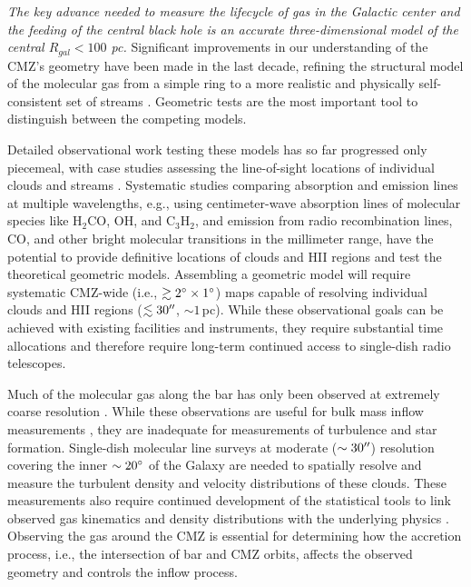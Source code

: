 \documentclass[modern]{aastex62}
\begin{document}
\textit{The key advance needed to measure the lifecycle of gas in the Galactic
center and the feeding of the central black hole is an accurate
three-dimensional model of the central $R_{gal}<100$ pc.} Significant improvements in
our understanding
of the CMZ's geometry have been made in the last decade, refining the structural
model of the molecular gas from a simple ring to a more realistic and physically
self-consistent set of streams
\citep{Molinari2011a,Kruijssen2015a,Ridley2017a,Sormani2018a,Kruijssen2019b}.
Geometric tests are the most important tool to distinguish
between the competing models.

Detailed observational work testing these models has so far progressed only
piecemeal, with case studies assessing the line-of-sight locations of
individual clouds and streams \citep[e.g.,][]{Henshaw2016a,Butterfield2018a}.
Systematic studies
comparing absorption and emission lines at multiple wavelengths, e.g., using
centimeter-wave absorption lines of molecular species like H$_2$CO, OH,
and C$_3$H$_2$, and emission from radio recombination lines, CO, and other bright
molecular transitions in the millimeter range, have the potential to provide
definitive locations of clouds and HII regions and test the theoretical
geometric models.  Assembling a geometric model will require systematic
CMZ-wide (i.e., $\gtrsim2^{\circ}\times1^{\circ}$) maps capable of resolving
individual clouds and HII regions ($\lesssim30\mbox{$^{\prime\prime}$}$, $\sim 1\,$pc).  While these
observational goals can be achieved with existing facilities and instruments,
they require substantial time allocations and therefore require long-term continued
access to single-dish radio telescopes.

Much of the molecular gas along the bar has only been observed at extremely
coarse resolution \citep{Dame2001a}. While these observations are useful for
bulk mass inflow measurements \citep[e.g.,][]{Sormani2019a}, they are
inadequate for measurements of turbulence and star formation. Single-dish
molecular line surveys at moderate ($\sim30\mbox{$^{\prime\prime}$}$) resolution covering the
inner $\sim20^{\circ}$ of the Galaxy are needed to spatially resolve and
measure the turbulent
density and velocity distributions of these clouds. These measurements also
require continued development of the statistical tools to link observed gas
kinematics
and density distributions with the underlying physics
\citep{Koch2017a,Burkhart2018a}.  Observing the gas around the CMZ is essential
for determining how the accretion process, i.e., the intersection of bar and
CMZ orbits, affects the observed geometry and controls the inflow process.
\end{document}
